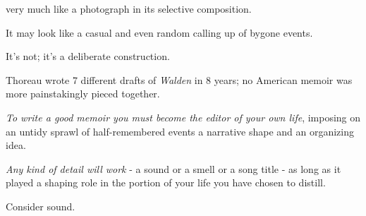 \documentclass{book}
\numberwithin{equation}{section}
\begin{document}
 very much like a photograph in its selective composition.

It may look like a casual and even random calling up of bygone events.

It's not; it's a deliberate construction.

Thoreau wrote 7 different drafts of \textit{Walden} in 8 years; no American memoir was more painstakingly pieced together.

\textit{To write a good memoir you must become the editor of your own life}, imposing on an untidy sprawl of half-remembered events a narrative shape and an organizing idea.


%

\textit{Any kind of detail will work} - a sound or a smell or a song title - as long as it played a shaping role in the portion of your life you have chosen to distill.

Consider sound.
\end{document}
